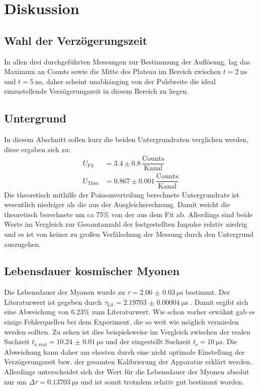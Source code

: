 \newpage
\section{Diskussion}
\label{sec:Diskussion}
\subsection{Wahl der Verzögerungszeit}
In allen drei durchgeführten Messungen zur Bestimmung der Auflösung, lag das Maximum an Counts sowie die Mitte des Plateau im Bereich zwischen $t=\SI{2}{\nano\second}$ und $t=\SI{5}{\nano\second}$, daher scheint unabhänging von der Pulsbreite die ideal einzustellende Verzögerungszeit in diesem Bereich zu liegen.
\subsection{Untergrund}
In diesem Abschnitt sollen kurz die beiden Untergrundraten verglichen werden, diese ergaben sich zu:
\begin{align*}
  U_\mathrm{Fit} &= 3.4\pm0.8 \, \dfrac{\mathrm{Counts}}{\mathrm{Kanal}} \\
  U_\mathrm{Theo}&=0.867\pm0.001 \, \dfrac{\mathrm{Counts}}{\mathrm{Kanal}}
\end{align*}
Die theoretisch mithilfe der Poissonverteilung berechnete Untergrundrate ist wesentlich niedriger als die aus der Ausgleichsrechnung. Damit weicht die theoretisch berechnete um ca 75\%
von der aus dem Fit ab. Allerdings sind beide Werte im Vergleich zur Gesamtanzahl der festgestellten Impulse relativ niedrig und es ist von keiner zu großen Verfälschung der Messung durch den Untergrund auszugehen.
\subsection{Lebensdauer kosmischer Myonen}
Die Lebensdauer der Myonen wurde zu $\tau = \SI{2.06(3)}{\micro\second}$ bestimmt. Der Literaturwert ist gegeben durch $\tau_\mathrm{Lit}=\SI{2.19703(4)}{\micro\second}$ \cite[152]{LitMyo}.
Damit ergibt sich eine Abweichung von 6.23\% zum Literaturwert. Wie schon vorher erwähnt gab es einige Fehlerquellen bei dem Experiment, die so weit wie möglich vermieden werden sollten. Zu sehen ist dies beispielsweise im Vergleich zwischen der realen Suchzeit $t_\mathrm{s,real}=\SI{10.24(1)}{\micro\second}$ und der eingestellt Suchzeit $t_\mathrm{s}=\SI{10}{\micro\second}$.
Die Abweichung kann daher am ehesten durch eine nicht optimale Einstellung der Verzögerungszeit bzw. der gesamten Kalibrierung der Apparatur erklärt werden. Allerdings unterscheidet sich
der Wert für die Lebensdauer der Myonen absolut nur um $\Delta \tau= \SI{0.13703}{\micro\second}$ und ist somit trotzdem relativ gut bestimmt worden.
